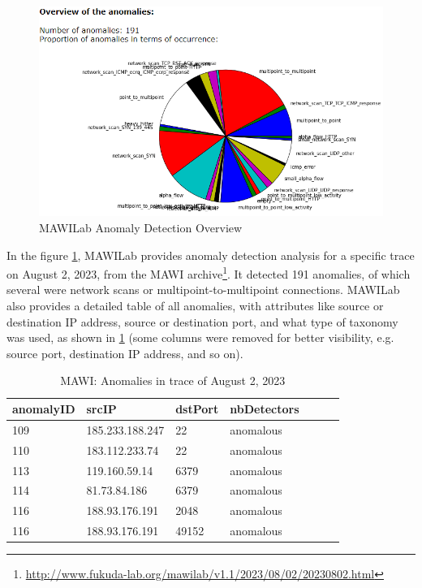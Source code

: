 \documentclass[sigconf,authorversion,nonacm]{acmart}
\begin{document}
\begin{figure}
        \includegraphics[width=\linewidth]{mawilab.PNG}
        \caption{MAWILab Anomaly Detection Overview}
        \label{MAWI: MAWILab Anomaly Detection Overview}
\end{figure}

In the figure \ref{MAWI: MAWILab Anomaly Detection Overview}, MAWILab provides anomaly detection analysis for a specific trace on August 2, 2023, from the MAWI archive\footnote{\url{http://www.fukuda-lab.org/mawilab/v1.1/2023/08/02/20230802.html}}. It detected 191 anomalies, of which several were network scans or multipoint-to-multipoint connections. MAWILab also provides a detailed table of all anomalies, with attributes like source or destination IP address, source or destination port, and what type of taxonomy was used, as shown in \ref{anomaly} (some columns were removed for better visibility, e.g. source port, destination IP address, and so on).

\begin{table}[!ht]
    \centering
    \caption{MAWI: Anomalies in trace of August 2, 2023}
    \label{anomaly}
    \begin{tabular}{|l|l|l|l|l|l|l|}
    \hline
        anomalyID &  srcIP & dstPort & nbDetectors \\ \hline
        109 & 185.233.188.247 & 22 & anomalous \\ \hline
        110 & 183.112.233.74 & 22 & anomalous \\ \hline
        113 & 119.160.59.14 & 6379 & anomalous \\ \hline
        114 & 81.73.84.186 & 6379 & anomalous \\ \hline
        116 & 188.93.176.191 & 2048 & anomalous \\ \hline
        116 & 188.93.176.191 & 49152 & anomalous \\ \hline
    \end{tabular}
\end{table}
\end{document}

